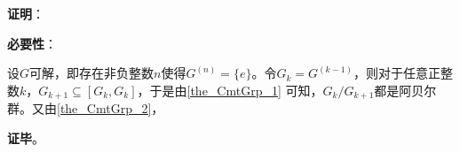 \textbf{证明}：

\textbf{必要性}：

设$G$可解，即存在非负整数$n$使得$G^{(n)}=\{e\}$。令$G_k=G^{(k-1)}$，则对于任意正整数$k$，$G_{k+1}\subseteq [G_k, G_k]$，于是由\autoref{the_CmtGrp_1} 可知，$G_k/G_{k+1}$都是阿贝尔群。又由\autoref{the_CmtGrp_2}，

\textbf{证毕}。




































